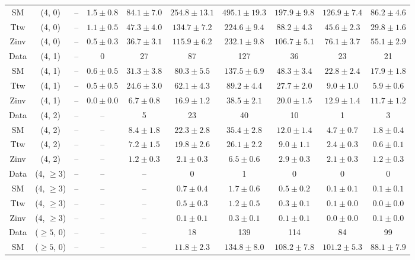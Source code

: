 \begin{table}[h!]
{\begin{tabular}{cccccccccc}
	SM & (4, 0) & -- & $1.5\pm 0.8$ & $84.1\pm 7.0$ & $254.8\pm 13.1$ & $495.1\pm 19.3$ & $197.9\pm 9.8$ & $126.9\pm 7.4$ & $86.2\pm 4.6$ \\[0.5ex] 
	Ttw & (4, 0) & -- & $1.1\pm 0.5$ & $47.3\pm 4.0$ & $134.7\pm 7.2$ & $224.6\pm 9.4$ & $88.2\pm 4.3$ & $45.6\pm 2.3$ & $29.8\pm 1.6$ \\[0.5ex] 
	Zinv & (4, 0) & -- & $0.5\pm 0.3$ & $36.7\pm 3.1$ & $115.9\pm 6.2$ & $232.1\pm 9.8$ & $106.7\pm 5.1$ & $76.1\pm 3.7$ & $55.1\pm 2.9$ \\[0.5ex] 
	Data & (4, 1) & -- & 0 & 27 & 87 & 127 & 36 & 23 & 21 \\[0.5ex] 
	SM & (4, 1) & -- & $0.6\pm 0.5$ & $31.3\pm 3.8$ & $80.3\pm 5.5$ & $137.5\pm 6.9$ & $48.3\pm 3.4$ & $22.8\pm 2.4$ & $17.9\pm 1.8$ \\[0.5ex] 
	Ttw & (4, 1) & -- & $0.5\pm 0.5$ & $24.6\pm 3.0$ & $62.1\pm 4.3$ & $89.2\pm 4.4$ & $27.7\pm 2.0$ & $9.0\pm 1.0$ & $5.9\pm 0.6$ \\[0.5ex] 
	Zinv & (4, 1) & -- & $0.0\pm 0.0$ & $6.7\pm 0.8$ & $16.9\pm 1.2$ & $38.5\pm 2.1$ & $20.0\pm 1.5$ & $12.9\pm 1.4$ & $11.7\pm 1.2$ \\[0.5ex] 
	Data & (4, 2) & -- & -- & 5 & 23 & 40 & 10 & 1 & 3 \\[0.5ex] 
	SM & (4, 2) & -- & -- & $8.4\pm 1.8$ & $22.3\pm 2.8$ & $35.4\pm 2.8$ & $12.0\pm 1.4$ & $4.7\pm 0.7$ & $1.8\pm 0.4$ \\[0.5ex] 
	Ttw & (4, 2) & -- & -- & $7.2\pm 1.5$ & $19.8\pm 2.6$ & $26.1\pm 2.2$ & $9.0\pm 1.1$ & $2.4\pm 0.3$ & $0.6\pm 0.1$ \\[0.5ex] 
	Zinv & (4, 2) & -- & -- & $1.2\pm 0.3$ & $2.1\pm 0.3$ & $6.5\pm 0.6$ & $2.9\pm 0.3$ & $2.1\pm 0.3$ & $1.2\pm 0.3$ \\[0.5ex] 
	Data & (4, $\ge3$) & -- & -- & -- & 0 & 1 & 0 & 0 & 0 \\[0.5ex] 
	SM & (4, $\ge3$) & -- & -- & -- & $0.7\pm 0.4$ & $1.7\pm 0.6$ & $0.5\pm 0.2$ & $0.1\pm 0.1$ & $0.1\pm 0.1$ \\[0.5ex] 
	Ttw & (4, $\ge3$) & -- & -- & -- & $0.5\pm 0.3$ & $1.2\pm 0.5$ & $0.3\pm 0.1$ & $0.1\pm 0.0$ & $0.0\pm 0.0$ \\[0.5ex] 
	Zinv & (4, $\ge3$) & -- & -- & -- & $0.1\pm 0.1$ & $0.3\pm 0.1$ & $0.1\pm 0.1$ & $0.0\pm 0.0$ & $0.1\pm 0.0$ \\[0.5ex] 
	Data & ($\ge5$, 0) & -- & -- & -- & 18 & 139 & 114 & 84 & 99 \\[0.5ex] 
	SM & ($\ge5$, 0) & -- & -- & -- & $11.8\pm 2.3$ & $134.8\pm 8.0$ & $108.2\pm 7.8$ & $101.2\pm 5.3$ & $88.1\pm 7.9$ \\[0.5ex] 

\end{tabular}}
\end{table}
